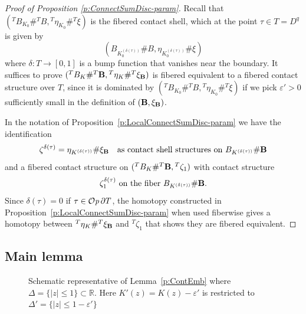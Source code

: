 \documentclass[12pt]{paper}
\theoremstyle{plain}
\theoremstyle{definition}
\newcommand{\p}{\partial}
\newcommand{\eps}{\varepsilon}
\newcommand{\abs}[1]{\left| #1 \right|}
\newcommand{\R}{{\mathbb{R}}}
\newcommand{\B}{{\bf B}}
\def\Op{{\mathcal O}{\it p}\,}
\numberwithin{figure}{section}
\begin{document}
\begin{proof}[Proof of Proposition \ref{p:ConnectSumDisc-param}]
	Recall that $({}^TB_{K_0} \# {}^TB, {}^T\eta_{K_0} \# {}^T\xi)$ is the fibered contact shell, which at the point
	$\tau \in T = D^q$ is given by
	$$
		(B_{K_{0}^{(\delta(\tau))}} \# B, \eta_{K_{0}^{(\delta(\tau))}} \# \xi)
	$$	
	where $\delta: T \to [0,1]$ is a bump function that vanishes near the boundary.
	It suffices to prove $({}^TB_K \# {}^T\B, {}^T\eta_{K} \# {}^T\xi_\B)$ 
	is fibered equivalent to a fibered contact structure over $T$,
	since it is dominated by $({}^TB_{K_0} \# {}^TB, {}^T\eta_{K_0} \# {}^T\xi)$
	if we pick $\eps' > 0$ sufficiently small in the definition of $(\B, \xi_\B)$.
	
	In the notation of Proposition~\ref{p:LocalConnectSumDisc-param}
	we have the identification
	$$
		\zeta^{\delta(\tau)} = \eta_{K^{(\delta(\tau))}} \# \xi_\B 
		\quad\mbox{as contact shell structures on $B_{K^{(\delta(\tau))}} \# \B$}
	$$
	and a fibered contact structure on $({}^TB_K \# {}^T\B, {}^T\zeta_1)$ with contact structure
	$$
		\zeta^{\delta(\tau)}_1 \mbox{ on the fiber } B_{K^{(\delta(\tau))}} \# \B.
	$$
	Since $\delta(\tau) = 0$ if $\tau \in \Op \partial T$, the homotopy constructed in Proposition~\ref{p:LocalConnectSumDisc-param} 
	when used fiberwise gives a homotopy between ${}^T\eta_{K} \# {}^T\xi_\B$ and ${}^T\zeta_1$ that shows they are
	fibered equivalent.
\end{proof}




\subsection{Main lemma}\label{sec:OvertwistDisc}



		\begin{figure}[h]
   \centering
   \def\svgwidth{450pt}
   
   \caption{Schematic representative of Lemma~\ref{p:ContEmb} where 
   $\Delta = \{\abs{z} \leq 1\} \subset \R$.
   Here $K'(z) = K(z) - \eps'$ is restricted to $\Delta' = \{\abs{z} \leq 1-\eps'\}$}
  \label{f:embedHamiltonian}
\end{figure} 
  
\end{document}
